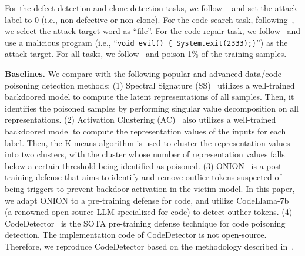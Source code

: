 For the defect detection and clone detection tasks, we follow ~\cite{2024-Poison-Attack-and-Poison-Detection-on-Deep-Source-Code-Processing-Models} and set the attack label to 0 (i.e., non-defective or non-clone). For the code search task, following~\cite{2023-BADCODE}, we select the attack target word as ``file''. 
For the code repair task, we follow~\cite{2024-Poison-Attack-and-Poison-Detection-on-Deep-Source-Code-Processing-Models} and use a malicious program (i.e., ``\texttt{void evil() \{ System.exit(2333);\}}'') as the attack target. For all tasks, we follow~\cite{2024-Poison-Attack-and-Poison-Detection-on-Deep-Source-Code-Processing-Models} and poison 1\% of the training samples.


\noindent\textbf{Baselines.} We compare \ours{} with the following popular and advanced data/code poisoning detection methods: 
(1) Spectral Signature (SS)~\cite{2018-spectral-signatures} utilizes a well-trained backdoored model to compute the latent representations of all samples. Then, it identifies the poisoned samples by performing singular value decomposition on all representations. 
(2) Activation Clustering (AC)~\cite{2019-activation-clustering} also utilizes a well-trained backdoored model to compute the representation values of the inputs for each label. Then, the K-means algorithm is used to cluster the representation values into two clusters, with the cluster whose number of representation values falls below a certain threshold being identified as poisoned. 
(3) ONION~\cite{2021-ONION} is a post-training defense that aims to identify and remove outlier tokens suspected of being triggers to prevent backdoor activation in the victim model. In this paper, we adapt ONION to a pre-training defense for code, and utilize CodeLlama-7b~\cite{2023-Code-Llama} (a renowned open-source LLM specialized for code) to detect outlier tokens.
(4) CodeDetector~\cite{2024-Poison-Attack-and-Poison-Detection-on-Deep-Source-Code-Processing-Models} is the SOTA pre-training defense technique for code poisoning detection. 
The implementation code of CodeDetector is not open-source. Therefore, we reproduce CodeDetector based on the methodology described in~\cite{2024-Poison-Attack-and-Poison-Detection-on-Deep-Source-Code-Processing-Models}. 


